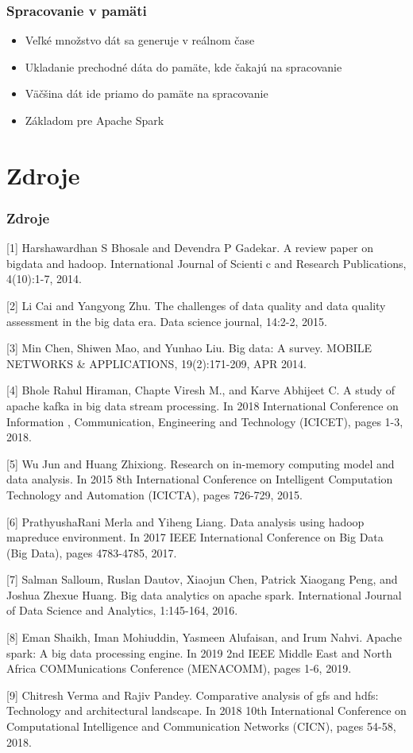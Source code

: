 \documentclass{beamer}
\begin{document}
\begin{frame}[fragile=singleslide]\frametitle{Spracovanie v pamäti}
\begin{itemize}
\item Veľké množstvo dát sa generuje v reálnom čase
\item Ukladanie prechodné dáta do pamäte, kde čakajú na spracovanie
\item Väčšina dát ide priamo do pamäte na spracovanie
\item Základom pre Apache Spark
\end{itemize}
\end{frame}






\section*{Zdroje}
\begin{frame}[allowframebreaks]\frametitle{Zdroje}
[1] Harshawardhan S Bhosale and Devendra P Gadekar.
A review paper on bigdata and hadoop.
International Journal of Scientic and Research Publications, 4(10):1-7, 2014.

[2] Li Cai and Yangyong Zhu.
The challenges of data quality and data quality assessment in the big data era.
Data science journal, 14:2-2, 2015.

[3] Min Chen, Shiwen Mao, and Yunhao Liu.
Big data: A survey.
MOBILE NETWORKS \& APPLICATIONS, 19(2):171-209, APR 2014.

[4] Bhole Rahul Hiraman, Chapte Viresh M., and Karve Abhijeet C.
A study of apache kafka in big data stream processing.
In 2018 International Conference on Information , Communication, Engineering and Technology (ICICET), pages 1-3, 2018.

[5] Wu Jun and Huang Zhixiong.
Research on in-memory computing model and data analysis.
In 2015 8th International Conference on Intelligent Computation Technology and Automation (ICICTA), pages 726-729, 2015.

[6] PrathyushaRani Merla and Yiheng Liang.
Data analysis using hadoop mapreduce environment.
In 2017 IEEE International Conference on Big Data (Big Data), pages 4783-4785, 2017.

[7] Salman Salloum, Ruslan Dautov, Xiaojun Chen, Patrick Xiaogang Peng, and Joshua Zhexue Huang.
Big data analytics on apache spark.
International Journal of Data Science and Analytics, 1:145-164, 2016.

[8] Eman Shaikh, Iman Mohiuddin, Yasmeen Alufaisan, and Irum Nahvi.
Apache spark: A big data processing engine.
In 2019 2nd IEEE Middle East and North Africa COMMunications Conference (MENACOMM), pages 1-6, 2019.

[9] Chitresh Verma and Rajiv Pandey.
Comparative analysis of gfs and hdfs: Technology and architectural landscape.
In 2018 10th International Conference on Computational Intelligence and Communication Networks (CICN), pages 54-58, 2018.
\end{frame}
\end{document}
